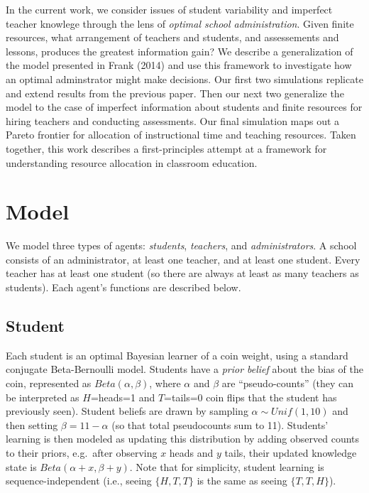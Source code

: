 \documentclass[10pt, letterpaper]{article}
\begin{document}
In the current work, we consider issues of student variability and
imperfect teacher knowlege through the lens of \emph{optimal school
administration}. Given finite resources, what arrangement of teachers
and students, and assessements and lessons, produces the greatest
information gain? We describe a generalization of the model presented in
Frank (2014) and use this framework to investigate how an optimal
adminstrator might make decisions. Our first two simulations replicate
and extend results from the previous paper. Then our next two generalize
the model to the case of imperfect information about students and finite
resources for hiring teachers and conducting assessments. Our final
simulation maps out a Pareto frontier for allocation of instructional
time and teaching resources. Taken together, this work describes a
first-principles attempt at a framework for understanding resource
allocation in classroom education.

\section{Model}\label{model}

We model three types of agents: \emph{students}, \emph{teachers}, and
\emph{administrators}. A school consists of an administrator, at least
one teacher, and at least one student. Every teacher has at least one
student (so there are always at least as many teachers as students).
Each agent's functions are described below.

\subsection{Student}\label{student}

Each student is an optimal Bayesian learner of a coin weight, using a
standard conjugate Beta-Bernoulli model. Students have a \emph{prior
belief} about the bias of the coin, represented as
\(Beta(\alpha,\beta)\), where \(\alpha\) and \(\beta\) are
``pseudo-counts'' (they can be interpreted as \(H\)=heads=1 and
\(T\)=tails=0 coin flips that the student has previously seen). Student
beliefs are drawn by sampling \(\alpha \sim Unif(1,10)\) and then
setting \(\beta = 11 - \alpha\) (so that total pseudocounts sum to 11).
Students' learning is then modeled as updating this distribution by
adding observed counts to their priors, e.g.~after observing \(x\) heads
and \(y\) tails, their updated knowledge state is
\(Beta(\alpha + x, \beta + y)\). Note that for simplicity, student
learning is sequence-independent (i.e., seeing \(\{H, T, T\}\) is the
same as seeing \(\{T, T, H\}\)).
\end{document}
